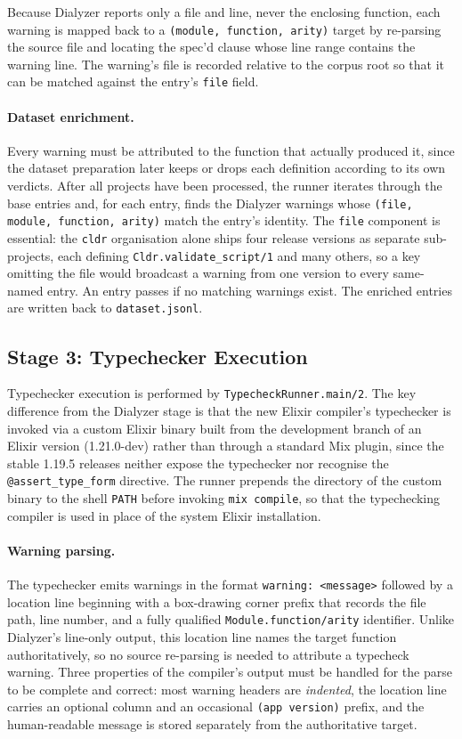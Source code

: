 Because Dialyzer reports only a file and line, never the enclosing function, each warning is mapped back to a \texttt{(module, function, arity)} target by re-parsing the source file and locating the spec'd clause whose line range contains the warning line.
The warning's file is recorded relative to the corpus root so that it can be matched against the entry's \texttt{file} field.

\paragraph{Dataset enrichment.}
Every warning must be attributed to the function that actually produced it, since the dataset preparation later keeps or drops each definition according to its own verdicts.
After all projects have been processed, the runner iterates through the base entries and, for each entry, finds the Dialyzer warnings whose \texttt{(file, module, function, arity)} match the entry's identity.
The \texttt{file} component is essential: the \texttt{cldr} organisation alone ships four release versions as separate sub-projects, each defining \texttt{Cldr.validate\_script/1} and many others, so a key omitting the file would broadcast a warning from one version to every same-named entry.
An entry passes if no matching warnings exist.
The enriched entries are written back to \texttt{dataset.jsonl}.

\subsection{Stage 3: Typechecker Execution}

Typechecker execution is performed by \texttt{TypecheckRunner.main/2}.
The key difference from the Dialyzer stage is that the new Elixir compiler's typechecker is invoked via a custom Elixir binary built from the development branch of an Elixir version (1.21.0-dev) rather than through a standard Mix plugin, since the stable 1.19.5 releases neither expose the typechecker nor recognise the \texttt{@assert\_type\_form} directive.
The runner prepends the directory of the custom binary to the shell \texttt{PATH} before invoking \texttt{mix compile}, so that the typechecking compiler is used in place of the system Elixir installation.

\paragraph{Warning parsing.}
The typechecker emits warnings in the format \texttt{warning: <message>} followed by a location line beginning with a box-drawing corner prefix that records the file path, line number, and a fully qualified \texttt{Module.function/arity} identifier.
Unlike Dialyzer's line-only output, this location line names the target function authoritatively, so no source re-parsing is needed to attribute a typecheck warning.
Three properties of the compiler's output must be handled for the parse to be complete and correct: most warning headers are \emph{indented}, the location line carries an optional column and an occasional \texttt{(app version)} prefix, and the human-readable message is stored separately from the authoritative target.

